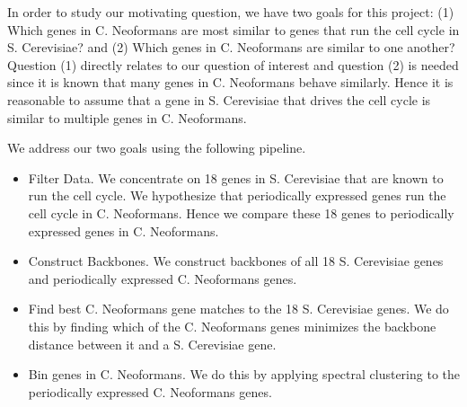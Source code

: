 In order to study our motivating question, we have two goals for this project: (1) Which genes in C. Neoformans are most similar to genes that run the cell cycle in S. Cerevisiae? and (2) Which genes in C. Neoformans are similar to one another? Question (1) directly relates to our question of interest and question (2) is needed since it is known that many genes in C. Neoformans behave similarly. Hence it is reasonable to assume that a gene in S. Cerevisiae that drives the cell cycle is similar to multiple genes in C. Neoformans. 

 We address our two goals using the following pipeline. 
\begin{itemize}
\item Filter Data. We concentrate on 18 genes in S. Cerevisiae that are known to run the cell cycle. We hypothesize that periodically expressed genes run the cell cycle in C. Neoformans. Hence we compare these 18 genes to periodically expressed genes in C. Neoformans.
\item Construct Backbones. We construct backbones of all 18 S. Cerevisiae genes and periodically expressed C. Neoformans genes. 
\item Find best C. Neoformans gene matches to the 18 S. Cerevisiae genes.  We do this by finding which of the C. Neoformans genes minimizes the backbone distance between it and a S. Cerevisiae gene.
\item Bin genes in C. Neoformans. We do this by applying spectral clustering to the periodically expressed C. Neoformans genes.
\end{itemize}

